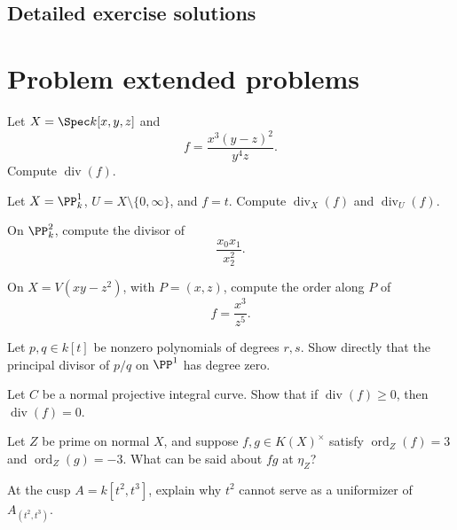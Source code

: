 \subsection*{Detailed exercise solutions}

\fi
\section{Problem extended problems}
\begin{problem}\label{prob:vi39-p1}
Let \(X=\Spec k[x,y,z]\) and
\[
f=\frac{x^3(y-z)^2}{y^4z}.
\]
Compute \(\operatorname{div}(f)\).
\end{problem}
\begin{problem}\label{prob:vi39-p2}
Let \(X=\PP^1_k\), \(U=X\setminus\{0,\infty\}\), and \(f=t\).  Compute \(\operatorname{div}_X(f)\) and \(\operatorname{div}_U(f)\).
\end{problem}
\begin{problem}\label{prob:vi39-p3}
On \(\PP^2_k\), compute the divisor of
\[
\frac{x_0x_1}{x_2^2}.
\]
\end{problem}
\begin{problem}\label{prob:vi39-p4}
On \(X=V(xy-z^2)\), with \(P=(x,z)\), compute the order along \(P\) of
\[
f=\frac{x^3}{z^5}.
\]
\end{problem}
\begin{problem}\label{prob:vi39-p5}
Let \(p,q\in k[t]\) be nonzero polynomials of degrees \(r,s\).  Show directly that the principal divisor of \(p/q\) on \(\PP^1\) has degree zero.
\end{problem}
\begin{problem}\label{prob:vi39-p6}
Let \(C\) be a normal projective integral curve.  Show that if \(\operatorname{div}(f)\ge0\), then \(\operatorname{div}(f)=0\).
\end{problem}
\begin{problem}\label{prob:vi39-p7}
Let \(Z\) be prime on normal \(X\), and suppose \(f,g\in K(X)^\times\) satisfy \(\operatorname{ord}_Z(f)=3\) and \(\operatorname{ord}_Z(g)=-3\).  What can be said about \(fg\) at \(\eta_Z\)?
\end{problem}
\begin{problem}\label{prob:vi39-p8}
At the cusp \(A=k[t^2,t^3]\), explain why \(t^2\) cannot serve as a uniformizer of \(A_{(t^2,t^3)}\).
\end{problem}
